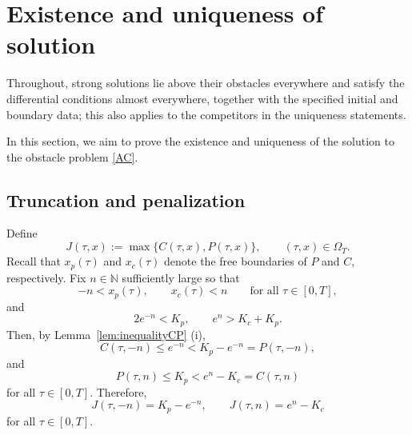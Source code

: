 \documentclass[11pt, a4paper, leqno]{amsart}
\numberwithin{equation}{section}
\theoremstyle{plain}
\theoremstyle{definition}
\theoremstyle{remark}
\def\leq{\leqslant}
\def\geq{\geqslant}
\begin{document}

\section{Existence and uniqueness of solution}\label{sec:3}
Throughout, strong solutions lie above their obstacles everywhere and
satisfy the differential conditions almost everywhere, together with the
specified initial and boundary data; this also applies to the competitors
in the uniqueness statements.


In this section, we aim to prove the existence and uniqueness of the solution to the obstacle problem \eqref{AC}.

\subsection{Truncation and penalization}

{
Define
\[
    J(\tau,x):=\max\{C(\tau,x),P(\tau,x)\},
    \qquad (\tau,x)\in\Omega_T.
\]
Recall that $x_p(\tau)$ and $x_c(\tau)$ denote the free boundaries
of $P$ and $C$, respectively.
Fix $n\in\mathbb N$ sufficiently large so that
\[
    -n<x_p(\tau),
    \qquad
    x_c(\tau)<n
    \qquad\text{for all }\tau\in[0,T],
\]
and
\[
    2e^{-n}<K_p,
    \qquad
    e^n>K_c+K_p.
\]
Then, by Lemma~\ref{lem:inequalityCP} (i),
\[
    C(\tau,-n)\leq e^{-n}
    <K_p-e^{-n}
    =P(\tau,-n),
\]
and
\[
    P(\tau,n)\leq K_p
    <e^n-K_c
    =C(\tau,n)
\]
for all $\tau\in[0,T]$. Therefore,
\[
    J(\tau,-n)=K_p-e^{-n},
    \qquad
    J(\tau,n)=e^n-K_c
\]
for all $\tau\in[0,T]$.
}
\end{document}

